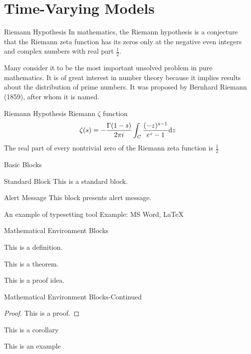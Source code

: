 \documentclass{beamer}
\begin{document}
\section{Time-Varying Models}
\begin{frame}{Riemann Hypothesis}
    In mathematics, the Riemann hypothesis is a conjecture that the Riemann zeta function has its zeros only at the negative even integers and complex numbers with real part $\frac{1}{2}$. 
    
    Many consider it to be the most important unsolved problem in pure mathematics. It is of great interest in number theory because it implies results about the distribution of prime numbers. It was proposed by Bernhard Riemann (1859), after whom it is named.
    \begin{alertblock}{Riemann Hypothesis}
        Riemann $\zeta$ function
        \[
            \zeta(s)= - \frac{\Gamma(1-s)}{2\pi i} \int_{C} \frac{(-z)^{s-1}}{e^z-1} {\rm d} z
        \]
        The real part of every nontrivial zero of the Riemann zeta function is $\frac{1}{2}$
        \end{alertblock}
\end{frame}

\begin{frame}{Basic Blocks}
    \begin{block}{Standard Block}
        This is a standard block.
    \end{block}
    \begin{alertblock}{Alert Message}
        This block presents alert message.
    \end{alertblock}
    \begin{exampleblock}{An example of typesetting tool}
        Example: MS Word, \LaTeX{}
    \end{exampleblock}
\end{frame}

\begin{frame}{Mathematical Environment Blocks}
    \begin{definition} 
        This is a definition.
    \end{definition}
    
    \begin{theorem} 
        This is a theorem. 
    \end{theorem}
    
    \begin{lemma} 
        This is a proof idea.
    \end{lemma}
\end{frame}
\begin{frame}{Mathematical Environment Blocks-Continued}
    \begin{proof} 
        This is a proof. 
    \end{proof}
    
    \begin{corollary}
        This is a corollary
    \end{corollary}
    
    \begin{example}
        This is an example 
    \end{example}
\end{frame}
\end{document}
